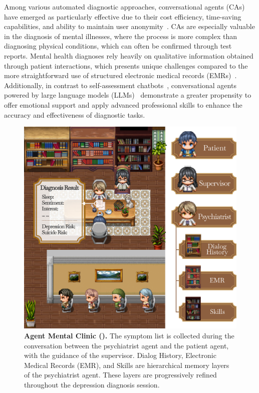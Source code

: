 Among various automated diagnostic approaches, conversational agents (CAs) have emerged as particularly effective due to their cost efficiency, time-saving capabilities, and ability to maintain user anonymity~\cite{Ma2023UnderstandingTB}. CAs are especially valuable in the diagnosis of mental illnesses, where the process is more complex than diagnosing physical conditions, which can often be confirmed through test reports. Mental health diagnoses rely heavily on qualitative information obtained through patient interactions, which presents unique challenges compared to the more straightforward use of structured electronic medical records (EMRs)~\cite{Li2024AgentHA}. Additionally, in contrast to self-assessment chatbots~\cite{Jaiswal2019VirtualHQ}, conversational agents powered by large language models (LLMs)~\cite{chen2023llmempoweredchatbotspsychiatristpatient} demonstrate a greater propensity to offer emotional support and apply advanced professional skills to enhance the accuracy and effectiveness of diagnostic tasks.
\begin{figure}[!t]
    \centering
    \includegraphics[width=1\linewidth]{fig/demo.png}
    \caption{\textbf{Agent Mental Clinic (\system).} The symptom list is collected during the conversation between the psychiatrist agent and the patient agent, with the guidance of the supervisor. Dialog History, Electronic Medical Records (EMR), and Skills are hierarchical memory layers of the psychiatrist agent. These layers are progressively refined throughout the depression diagnosis session.}
    \label{fig:demo}
\end{figure}



